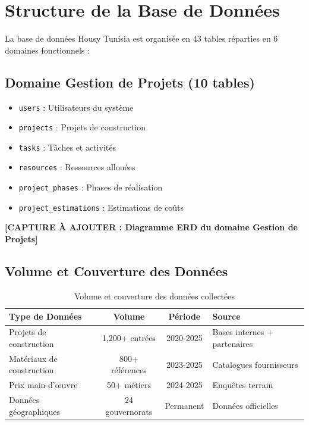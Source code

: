 \section{Structure de la Base de Données}

La base de données Housy Tunisia est organisée en 43 tables réparties en 6 domaines fonctionnels :

\subsection{Domaine Gestion de Projets (10 tables)}

\begin{itemize}
    \item \texttt{users} : Utilisateurs du système
    \item \texttt{projects} : Projets de construction
    \item \texttt{tasks} : Tâches et activités
    \item \texttt{resources} : Ressources allouées
    \item \texttt{project\_phases} : Phases de réalisation
    \item \texttt{project\_estimations} : Estimations de coûts
\end{itemize}

\textbf{[CAPTURE À AJOUTER : Diagramme ERD du domaine Gestion de Projets]}

\subsection{Volume et Couverture des Données}

\begin{table}[h]
\centering
\begin{tabular}{|l|c|c|l|}
\hline
\textbf{Type de Données} & \textbf{Volume} & \textbf{Période} & \textbf{Source} \\
\hline
Projets de construction & 1,200+ entrées & 2020-2025 & Bases internes + partenaires \\
\hline
Matériaux de construction & 800+ références & 2023-2025 & Catalogues fournisseurs \\
\hline
Prix main-d'œuvre & 50+ métiers & 2024-2025 & Enquêtes terrain \\
\hline
Données géographiques & 24 gouvernorats & Permanent & Données officielles \\
\hline
\end{tabular}
\caption{Volume et couverture des données collectées}
\end{table}

